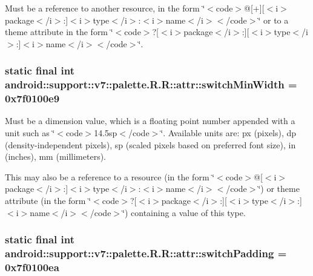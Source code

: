 Must be a reference to another resource, in the form \char`\"{}$<$code$>$@\mbox{[}+\mbox{]}\mbox{[}$<$i$>$package$<$/i$>$:\mbox{]}$<$i$>$type$<$/i$>$:$<$i$>$name$<$/i$>$$<$/code$>$\char`\"{} or to a theme attribute in the form \char`\"{}$<$code$>$?\mbox{[}$<$i$>$package$<$/i$>$:\mbox{]}\mbox{[}$<$i$>$type$<$/i$>$:\mbox{]}$<$i$>$name$<$/i$>$$<$/code$>$\char`\"{}. \hypertarget{classandroid_1_1support_1_1v7_1_1palette_1_1_r_1_1attr_9c425794fef208a1e56f12431842c3e3}{
\subsubsection[{switchMinWidth}]{\setlength{\rightskip}{0pt plus 5cm}static final int android::support::v7::palette.R.R::attr::switchMinWidth = 0x7f0100e9}}
\label{classandroid_1_1support_1_1v7_1_1palette_1_1_r_1_1attr_9c425794fef208a1e56f12431842c3e3}


Must be a dimension value, which is a floating point number appended with a unit such as \char`\"{}$<$code$>$14.5sp$<$/code$>$\char`\"{}. Available units are: px (pixels), dp (density-independent pixels), sp (scaled pixels based on preferred font size), in (inches), mm (millimeters). 

This may also be a reference to a resource (in the form \char`\"{}$<$code$>$@\mbox{[}$<$i$>$package$<$/i$>$:\mbox{]}$<$i$>$type$<$/i$>$:$<$i$>$name$<$/i$>$$<$/code$>$\char`\"{}) or theme attribute (in the form \char`\"{}$<$code$>$?\mbox{[}$<$i$>$package$<$/i$>$:\mbox{]}\mbox{[}$<$i$>$type$<$/i$>$:\mbox{]}$<$i$>$name$<$/i$>$$<$/code$>$\char`\"{}) containing a value of this type. \hypertarget{classandroid_1_1support_1_1v7_1_1palette_1_1_r_1_1attr_f6f899fe9ae8c69fa9778e8b082ef46d}{
\subsubsection[{switchPadding}]{\setlength{\rightskip}{0pt plus 5cm}static final int android::support::v7::palette.R.R::attr::switchPadding = 0x7f0100ea}}
\label{classandroid_1_1support_1_1v7_1_1palette_1_1_r_1_1attr_f6f899fe9ae8c69fa9778e8b082ef46d}


